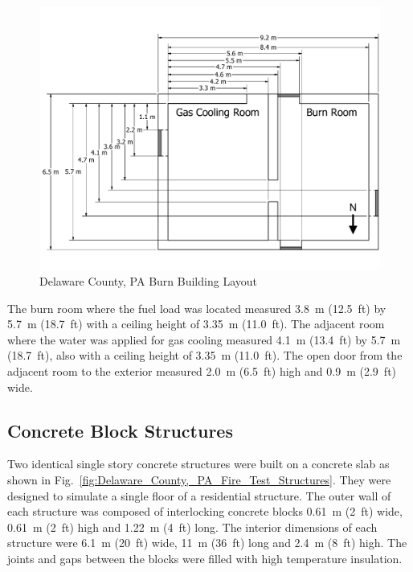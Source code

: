 \documentclass[12pt,oneside]{book}
\begin{document}
\begin{figure}[!ht]
	\includegraphics[width=\columnwidth]{../Figures/Floor_Plans/PDFs/West_Structure/DelCo_2012_West_Structure_Plain}
	\caption{Delaware County, PA Burn Building Layout}
	\label{fig:Delaware_County,_PA_Burn_Building_Layout}
\end{figure}

The burn room where the fuel load was located measured 3.8~m (12.5~ft) by 5.7~m (18.7~ft) with a ceiling height of 3.35~m (11.0~ft). The adjacent room where the water was applied for gas cooling measured 4.1~m (13.4~ft) by 5.7~m (18.7~ft), also with a ceiling height of 3.35~m (11.0~ft). The open door from the adjacent room to the exterior measured 2.0~m (6.5~ft) high and 0.9~m (2.9~ft) wide.

\subsection{Concrete Block Structures}
\label{sec:Experimental Structures}

Two identical single story concrete structures were built on a concrete slab as shown in Fig.~\ref{fig:Delaware_County,_PA_Fire_Test_Structures}. They were designed to simulate a single floor of a residential structure.  The outer wall of each structure was composed of interlocking concrete blocks 0.61~m (2~ft) wide, 0.61~m (2~ft) high and 1.22~m (4~ft) long.  The interior dimensions of each structure were 6.1~m (20~ft) wide, 11~m (36~ft) long and 2.4~m (8~ft) high. The joints and gaps between the blocks were filled with high temperature insulation.
\end{document}
